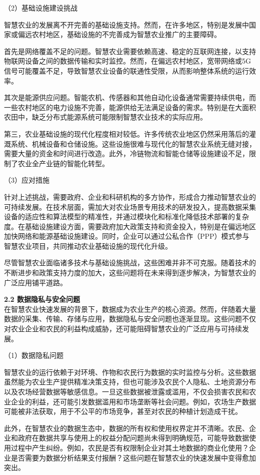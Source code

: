 （2）基础设施建设挑战

智慧农业的发展离不开完善的基础设施支持。然而，在许多地区，特别是发展中国家或偏远农村地区，基础设施的不完善成为智慧农业推广的主要障碍。

首先是网络覆盖不足的问题。智慧农业需要依赖高速、稳定的互联网连接，以支持物联网设备之间的数据传输和实时监控。然而，在偏远农村地区，宽带网络或5G信号可能覆盖不足，导致智慧农业设备的联通性受限，从而影响整体系统的运行效率。

其次是能源供应问题。智能农机、传感器和其他自动化设备通常需要持续供电，而一些农村地区的电力设施不完善，能源供给无法满足设备的需求。特别是在大面积农田中，缺乏分布式能源系统可能限制智慧农业技术的实际应用。

第三，农业基础设施的现代化程度相对较低。许多传统农业地区仍然采用落后的灌溉系统、机械设备和仓储设施。这些设施很难与现代化的智慧农业系统无缝对接，需要大量的资金和时间进行改造。此外，冷链物流和智能仓储等设施建设不足，限制了农业全产业链的智能化转型。

（3）应对措施

针对上述挑战，需要政府、企业和科研机构的多方协作，形成合力推动智慧农业的可持续发展。在技术层面，需加大对农业场景专用技术的研发投入，提高数据采集设备的适应性和算法模型的精准性，并通过模块化和标准化降低技术部署的复杂度。在基础设施建设方面，需要政府加大政策支持和资金投入，特别是在偏远地区加快网络和能源基础设施建设。同时，企业可以通过公私合作（PPP）模式参与智慧农业项目，共同推动农业基础设施的现代化升级。

尽管智慧农业面临诸多技术与基础设施挑战，这些困难并非不可克服。随着技术的不断进步和政策支持力度的加大，这些问题将在未来得到逐步解决，为智慧农业的广泛应用铺平道路。

\textbf{2.2 数据隐私与安全问题} \\
在智慧农业快速发展的背景下，数据成为农业生产的核心资源。然而，伴随着大量数据的采集、传输、存储与应用，数据隐私与安全问题也逐渐显现。这些问题不仅对农业企业和农民的利益构成威胁，还可能阻碍智慧农业的广泛应用与可持续发展。

（1）数据隐私问题

智慧农业的运行依赖于对环境、作物和农民行为数据的实时监控与分析。这些数据虽然能为农业生产提供精准决策支持，但也可能涉及农民个人隐私、土地资源分布以及农场经营数据等敏感信息。一旦这些数据被泄露或滥用，不仅会损害农民和农业企业的利益，还可能引发数据滥用和市场垄断等社会问题。例如，农场生产数据可能被非法获取，用于不公平的市场竞争，甚至对农民的种植计划造成干扰。

此外，在智慧农业的数据生态中，数据的所有权和使用权界定并不清晰。农民、企业和政府在数据共享与使用上的权益分配问题尚未得到明确规范，可能导致数据使用过程中产生纠纷。例如，农民是否有权限制企业对其土地数据的商业化使用？企业是否需要为数据分析结果支付报酬？这些问题在智慧农业的快速发展中变得愈加突出。

